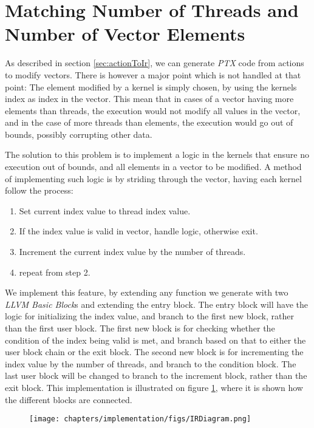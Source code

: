 \section{Matching Number of Threads and Number of Vector Elements}
As described in section \ref{sec:actionToIr}, we can generate \textit{PTX} code from actions to modify vectors. There is however a major point which is not handled at that point: The element modified by a kernel is simply chosen, by using the kernels index as index in the vector. This mean that in cases of a vector having more elements than threads, the execution would not modify all values in the vector, and in the case of more threads than elements, the execution would go out of bounds, possibly corrupting other data.

The solution to this problem is to implement a logic in the kernels that ensure no execution out of bounds, and all elements in a vector to be modified. A method of implementing such logic is by striding through the vector, having each kernel follow the process:

\begin{enumerate}
\item Set current index value to thread index value.
\item If the index value is valid in vector, handle logic, otherwise exit.
\item Increment the current index value by the number of threads.
\item repeat from step 2.
\end{enumerate}

We implement this feature, by extending any function we generate with two \textit{LLVM Basic Block}s and extending the entry block. The entry block will have the logic for initializing the index value, and branch to the first new block, rather than the first user block. The first new block is for checking whether the condition of the index being valid is met, and branch based on that to either the user block chain or the exit block. The second new block is for incrementing the index value by the number of threads, and branch to the condition block. The last user block will be changed to branch to the increment block, rather than the exit block. This implementation is illustrated on figure \ref{blockFlowLoop}, where it is shown how the different blocks are connected.

\begin{figure}[!htb]
    \centering
    \label{blockFlowLoop}
    \texttt{[image: chapters/implementation/figs/IRDiagram.png]}
\end{figure}